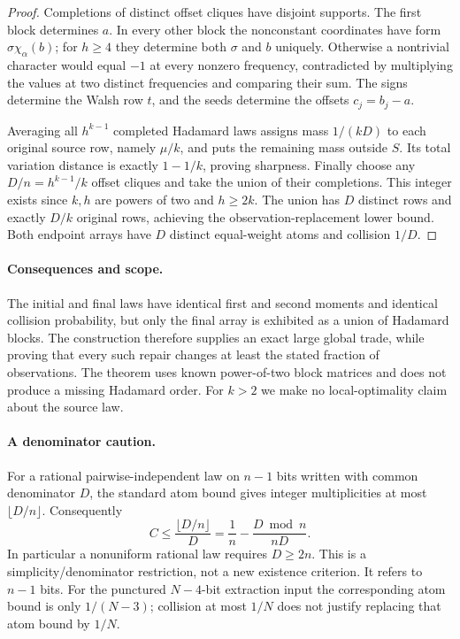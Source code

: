 \documentclass[11pt]{article}
\begin{document}
\begin{proof}
Completions of distinct offset cliques have disjoint supports. The first
block determines $a$. In every other block the nonconstant coordinates
have form $\sigma\chi_\alpha(b)$; for $h\ge4$ they determine both
$\sigma$ and $b$ uniquely. Otherwise a nontrivial character would equal
$-1$ at every nonzero frequency, contradicted by multiplying the values
at two distinct frequencies and comparing their sum. The signs determine
the Walsh row $t$, and the seeds determine the offsets $c_j=b_j-a$.

Averaging all $h^{k-1}$ completed Hadamard laws assigns mass
$1/(kD)$ to each original source row, namely $\mu/k$, and puts the
remaining mass outside $S$. Its total variation distance is exactly
$1-1/k$, proving sharpness. Finally choose any
$D/n=h^{k-1}/k$ offset cliques and take the union of their completions.
This integer exists since $k,h$ are powers of two and $h\ge2k$.
The union has $D$ distinct rows and exactly $D/k$ original rows, achieving
the observation-replacement lower bound. Both endpoint arrays have
$D$ distinct equal-weight atoms and collision $1/D$.
\end{proof}

\paragraph{Consequences and scope.}
The initial and final laws have identical first and second moments and
identical collision probability, but only the final array is exhibited
as a union of Hadamard blocks. The construction therefore supplies an
exact large global trade, while proving that every such repair changes
at least the stated fraction of observations. The theorem uses known
power-of-two block matrices and does not produce a missing Hadamard
order. For $k>2$ we make no local-optimality claim about the source law.

\paragraph{A denominator caution.}
For a rational pairwise-independent law on $n-1$ bits written with
common denominator $D$, the standard atom bound gives integer
multiplicities at most $\lfloor D/n\rfloor$. Consequently
\[
 C\le\frac{\lfloor D/n\rfloor}{D}
 =\frac1n-\frac{D\bmod n}{nD}.
\]
In particular a nonuniform rational law requires $D\ge2n$.
This is a simplicity/denominator restriction, not a new existence
criterion. It refers to $n-1$ bits. For the punctured $N-4$-bit extraction
input the corresponding atom bound is only $1/(N-3)$; collision at most
$1/N$ does not justify replacing that atom bound by $1/N$.
\end{document}
